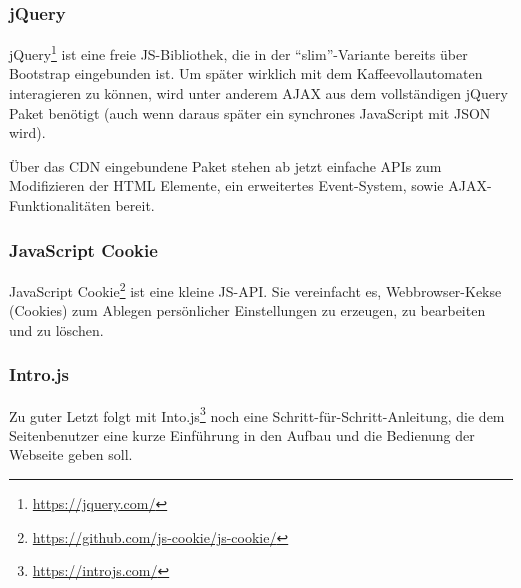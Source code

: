 \subsubsection{jQuery}
jQuery\footnote{\url{https://jquery.com/}} ist eine freie \ac{JS}-Bibliothek, die in der "`slim"'-Variante bereits über Bootstrap eingebunden ist.
Um später wirklich mit dem Kaffeevollautomaten interagieren zu können, wird unter anderem \ac{AJAX} aus dem vollständigen jQuery Paket benötigt (auch wenn daraus später ein synchrones JavaScript mit \acs{JSON} wird).

Über das \ac{CDN} eingebundene Paket stehen ab jetzt einfache \aclp{API} zum Modifizieren der \acs{HTML} Elemente, ein erweitertes Event-System, sowie \acs{AJAX}-Funktionalitäten bereit.

\subsubsection{JavaScript Cookie}
JavaScript Cookie\footnote{\url{https://github.com/js-cookie/js-cookie/}} ist eine kleine \acl{JS}-\ac{API}.
Sie vereinfacht es, Webbrowser-Kekse (Cookies) zum Ablegen persönlicher Einstellungen zu erzeugen, zu bearbeiten und zu löschen.

\subsubsection{Intro.js}
Zu guter Letzt folgt mit Into.js\footnote{\url{https://introjs.com/}} noch eine Schritt-für-Schritt-Anleitung, die dem Seitenbenutzer eine kurze Einführung in den Aufbau und die Bedienung der Webseite geben soll.
